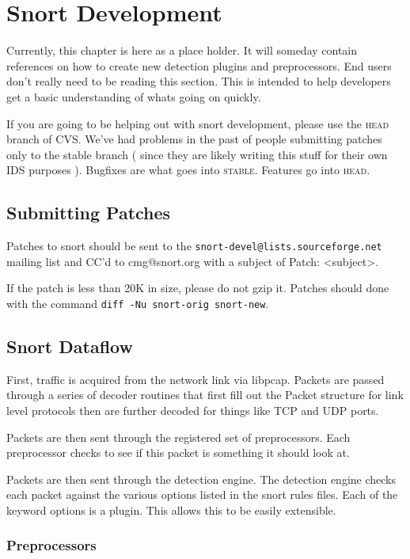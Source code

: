 \documentclass[english]{report}
\begin{document}
\chapter{Snort Development}

Currently, this chapter is here as a place holder. It will someday
contain references on how to create new detection plugins and
preprocessors.  End users don't really need to be reading this
section. This is intended to help developers get a basic understanding
of whats going on quickly.

If you are going to be helping out with snort development, please
use the \textsc{head} branch of CVS. We've had problems in the past
of people submitting patches only to the stable branch ( since they
are likely writing this stuff for their own IDS purposes ). Bugfixes
are what goes into \textsc{stable}. Features go into \textsc{head}.

\section{Submitting Patches}
Patches to snort should be sent to the
\verb!snort-devel@lists.sourceforge.net! mailing list and CC'd to
cmg@snort.org with a subject of Patch: <subject>.

If the patch is less than 20K in size, please do not gzip it. Patches
should done with the command \verb!diff -Nu snort-orig snort-new!.

\section{Snort Dataflow}
First, traffic is acquired from the network link via libpcap. Packets
are passed through a series of decoder routines that first fill out
the Packet structure for link level protocols then are further decoded
for things like TCP and UDP ports.

Packets are then sent through the registered set of preprocessors.
Each preprocessor checks to see if this packet is something it should
look at.

Packets are then sent through the detection engine. The detection
engine checks each packet against the various options listed in the
snort rules files. Each of the keyword options is a plugin. This allows
this to be easily extensible.


\subsection{Preprocessors}
\end{document}
